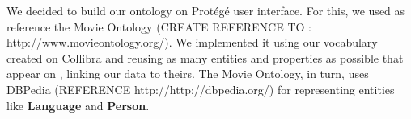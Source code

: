 We decided to build our ontology on Protégé user interface. For this, we used as reference the Movie Ontology \cite{movieontology} (CREATE REFERENCE TO : http://www.movieontology.org/). We implemented it using our vocabulary created on Collibra and reusing as many entities and properties as possible that appear on \cite{movieontology}, linking our data to theirs. The Movie Ontology, in turn, uses DBPedia \cite{dbpedia} (REFERENCE http://http://dbpedia.org/) for representing entities like \textbf{Language} and \textbf{Person}.
